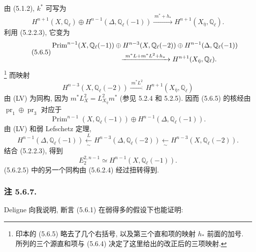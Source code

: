 由 (5.1.2), $k^*$ 可写为
\begin{equation}\tag{5.6.4}
H^{n+1}(X,\mathbb Q_\ell)
\oplus H^{n-1}(\Delta,\mathbb Q_\ell(-1))
\xrightarrow{\ m^*+h_*\ }
H^{n+1}(X_{\bar\eta},\mathbb Q_\ell).
\end{equation}
利用 (5.2.2.3), 它变为
\begin{equation}\tag{5.6.5}
\begin{split}
&\operatorname{Prim}^{n-1}(X,\mathbb Q_\ell(-1))
\oplus H^{n-3}(X,\mathbb Q_\ell(-2))
\oplus H^{n-1}(\Delta,\mathbb Q_\ell(-1))\\
&\hspace{35mm}\xrightarrow{\ m^*L+m^*L^2+h_*\ }
H^{n+1}(X_{\bar\eta},\mathbb Q_\ell).
\end{split}
\end{equation}
\footnote{印本的 (5.6.5) 略去了几个右括号, 以及第三个直和项的映射 $h_*$ 前面的加号. 所列的三个源直和项与 (5.6.4) 决定了这里给出的改正后的三项映射.}
而映射
\[
H^{n-3}(X,\mathbb Q_\ell(-2))
\xrightarrow{\ m^*L^2\ }
H^{n+1}(X_{\bar\eta},\mathbb Q_\ell)
\]
由 (LV) 为同构, 因为 $m^*L_X^2=L_{X_{\bar\eta}}^2m^*$ (参见 5.2.4 和 5.2.5). 因而 (5.6.5) 的核经由 $\operatorname{pr}_1\oplus\operatorname{pr}_3$ 对应于
\[
\operatorname{Prim}^{n-1}(X,\mathbb Q_\ell(-1))
\oplus H^{n-1}(\Delta,\mathbb Q_\ell(-1)).
\]
由 (LV) 和弱 Lefschetz 定理,
\[
H^{n-1}(\Delta,\mathbb Q_\ell(-1))
\xleftarrow[\sim]{\,L\,}
H^{n-3}(\Delta,\mathbb Q_\ell(-2))
\xleftarrow[\sim]{\ }
H^{n-3}(X,\mathbb Q_\ell(-2)).
\]
结合 (5.2.2.3), 得到
\begin{equation}\tag{5.6.6}
E_2^{2,n-1}\simeq H^{n-1}(X,\mathbb Q_\ell(-1)).
\end{equation}
(5.6.2.5) 中的另一个同构由 (5.6.2.4) 经过扭转得到.

\subsubsection*{注 5.6.7.}
Deligne 向我说明, 断言 (5.6.1) 在弱得多的假设下也能证明:
